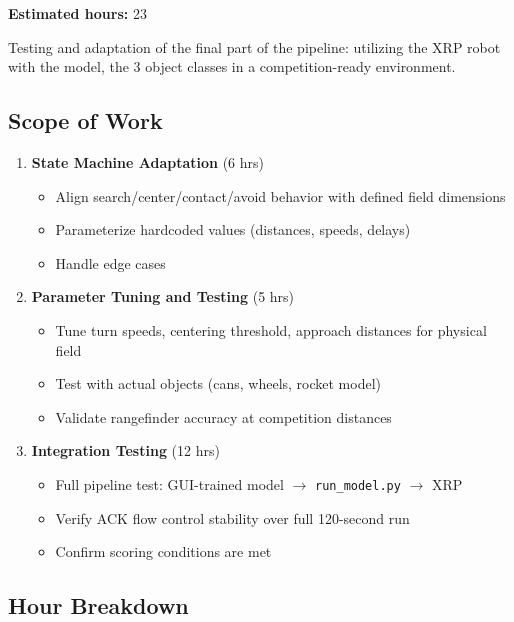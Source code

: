 \documentclass[a4]{article}
\begin{document}
\noindent \textbf{Estimated hours:} 23

\vspace{0.5em}

Testing and adaptation of the final part of the pipeline: utilizing the XRP robot with the model, the 3 object classes in a competition-ready environment. 

\subsection*{Scope of Work}

\begin{enumerate}[leftmargin=*]
    \item \textbf{State Machine Adaptation} (6 hrs)
    \begin{itemize}
        \item Align search/center/contact/avoid behavior with defined field dimensions
        \item Parameterize hardcoded values (distances, speeds, delays)
        \item Handle edge cases
    \end{itemize}

    \item \textbf{Parameter Tuning and Testing} (5 hrs)
    \begin{itemize}
        \item Tune turn speeds, centering threshold, approach distances for physical field
        \item Test with actual objects (cans, wheels, rocket model)
        \item Validate rangefinder accuracy at competition distances
    \end{itemize}

    \item \textbf{Integration Testing} (12 hrs)
    \begin{itemize}
        \item Full pipeline test: GUI-trained model $\rightarrow$ \texttt{run\_model.py} $\rightarrow$ XRP
        \item Verify ACK flow control stability over full 120-second run
        \item Confirm scoring conditions are met
    \end{itemize}
\end{enumerate}

\subsection*{Hour Breakdown}
\end{document}
